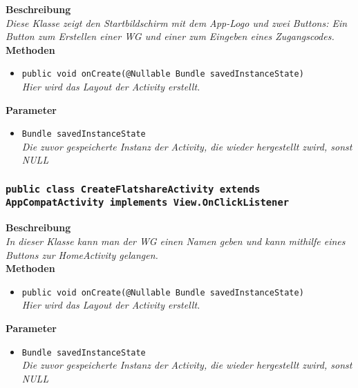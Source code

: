 \documentclass[a4paper]{scrreprt}
\begin{document}
               	\textbf{Beschreibung} \\
      	        \textit{Diese Klasse zeigt den Startbildschirm mit dem App-Logo und zwei Buttons: Ein Button zum Erstellen einer WG und einer zum Eingeben eines Zugangscodes.} \\
                
                \textbf{Methoden}
                \begin{itemize}
        		\item\texttt{{public void onCreate(@Nullable Bundle savedInstanceState)}}\\
                \textit{Hier wird das Layout der Activity erstellt.}\\
                \end{itemize}
                
                \textbf{Parameter}
                \begin{itemize}
        		\item\texttt{Bundle savedInstanceState}\\ 
                \textit{Die zuvor gespeicherte Instanz der Activity, die wieder hergestellt zwird, sonst NULL}\\
                \end{itemize}       
                
        \subsubsection{\texttt{public class CreateFlatshareActivity extends AppCompatActivity implements View.OnClickListener}}
               
               	\textbf{Beschreibung} \\
      	        \textit{In dieser Klasse kann man der WG einen Namen geben und kann mithilfe eines Buttons zur HomeActivity gelangen.} \\
                
                \textbf{Methoden}
                \begin{itemize}
        		\item\texttt{{public void onCreate(@Nullable Bundle savedInstanceState)}}\\
                \textit{Hier wird das Layout der Activity erstellt.}\\
                \end{itemize}
                
                \textbf{Parameter}
                \begin{itemize}
        		\item\texttt{Bundle savedInstanceState}\\ 
                \textit{Die zuvor gespeicherte Instanz der Activity, die wieder hergestellt zwird, sonst NULL}\\
                \end{itemize}      
                
\end{document}
